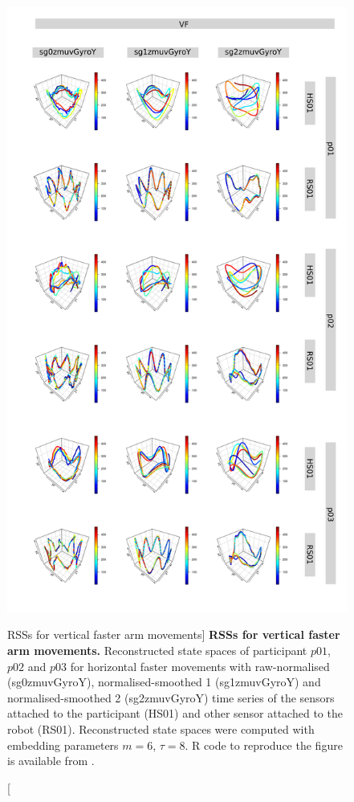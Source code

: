 \begin{figure}
\centering
\includegraphics[height=0.85\textheight]{rss_VF}
\caption
	[RSSs for vertical faster arm movements]{
	{\bf RSSs for vertical faster arm movements.}
	Reconstructed state spaces %
	of participant $p01$, $p02$ and $p03$ for horizontal faster movements 
	with raw-normalised (sg0zmuvGyroY), 
	normalised-smoothed 1 (sg1zmuvGyroY) and 
	normalised-smoothed 2 (sg2zmuvGyroY) time series of the 
	sensors attached to the participant (HS01) and other sensor 
	attached to the robot (RS01).	
	Reconstructed state spaces were computed with 
	embedding parameters $m=6$, $\tau=8$.
	R code to reproduce the figure is available from \cite{xochicale2018}.
        }
    \label{fig:rss_VF}
\end{figure}







